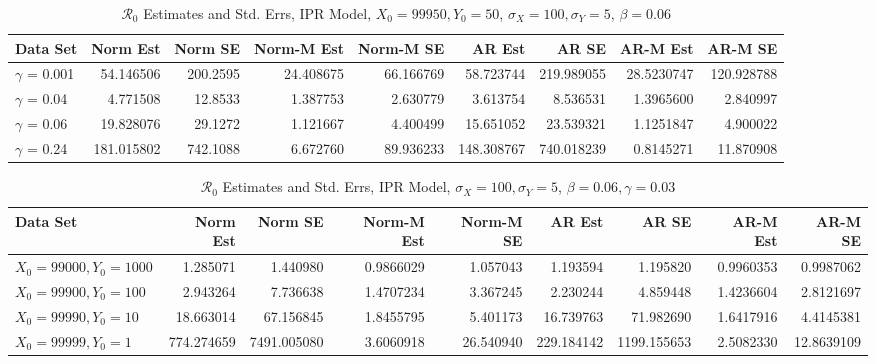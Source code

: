 \documentclass[12pt]{article}
\newcommand{\rr}{\ensuremath{\mathcal{R}_0}}
\begin{document}
\begin{table}[H]
	
	\caption{\label{tab:}$\rr$ Estimates and Std. Errs, IPR Model,
		$X_0 = 99950, Y_0 = 50$, $\sigma_X = 100, \sigma_Y = 5$, $\beta = 0.06$}
	\centering
	\begin{footnotesize}
		\begin{tabular}[t]{l|r|r|r|r|r|r|r|r}
			\hline
			Data Set & Norm Est & Norm SE & Norm-M Est & Norm-M SE & AR Est & AR SE & AR-M Est & AR-M SE\\
			\hline
			$\gamma$ = 0.001 & 54.146506 & 200.2595 & 24.408675 & 66.166769 & 58.723744 & 219.989055 & 28.5230747 & 120.928788\\
			\hline
			$\gamma$ = 0.04 & 4.771508 & 12.8533 & 1.387753 & 2.630779 & 3.613754 & 8.536531 & 1.3965600 & 2.840997\\
			\hline
			$\gamma$ = 0.06 & 19.828076 & 29.1272 & 1.121667 & 4.400499 & 15.651052 & 23.539321 & 1.1251847 & 4.900022\\
			\hline
			$\gamma$ = 0.24 & 181.015802 & 742.1088 & 6.672760 & 89.936233 & 148.308767 & 740.018239 & 0.8145271 & 11.870908\\
			\hline
		\end{tabular}
	\end{footnotesize}
\end{table}

\begin{table}[H]
	
	\caption{\label{tab:}$\rr$ Estimates and Std. Errs, IPR Model,
		$\sigma_X = 100, \sigma_Y = 5$, $\beta = 0.06, \gamma = 0.03$}
	\centering
	\begin{footnotesize}
		\begin{tabular}[t]{l|r|r|r|r|r|r|r|r}
			\hline
			Data Set & Norm Est & Norm SE & Norm-M Est & Norm-M SE & AR Est & AR SE & AR-M Est & AR-M SE\\
			\hline
			$X_0 = 99000, Y_0 = 1000$ & 1.285071 & 1.440980 & 0.9866029 & 1.057043 & 1.193594 & 1.195820 & 0.9960353 & 0.9987062\\
			\hline
			$X_0 = 99900, Y_0 = 100$ & 2.943264 & 7.736638 & 1.4707234 & 3.367245 & 2.230244 & 4.859448 & 1.4236604 & 2.8121697\\
			\hline
			$X_0 = 99990, Y_0 = 10$ & 18.663014 & 67.156845 & 1.8455795 & 5.401173 & 16.739763 & 71.982690 & 1.6417916 & 4.4145381\\
			\hline
			$X_0 = 99999, Y_0 = 1$ & 774.274659 & 7491.005080 & 3.6060918 & 26.540940 & 229.184142 & 1199.155653 & 2.5082330 & 12.8639109\\
			\hline
		\end{tabular}
	\end{footnotesize}
\end{table}
\end{document}
